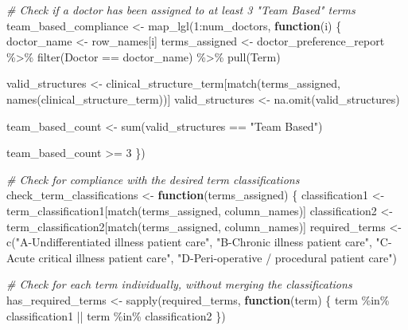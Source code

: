 \documentclass[
]{article}
\newenvironment{Shaded}{\begin{snugshade}}{\end{snugshade}}
\newcommand{\CommentTok}[1]{\textcolor[rgb]{0.56,0.35,0.01}{\textit{#1}}}
\newcommand{\ControlFlowTok}[1]{\textcolor[rgb]{0.13,0.29,0.53}{\textbf{#1}}}
\newcommand{\DecValTok}[1]{\textcolor[rgb]{0.00,0.00,0.81}{#1}}
\newcommand{\FunctionTok}[1]{\textcolor[rgb]{0.00,0.00,0.00}{#1}}
\newcommand{\NormalTok}[1]{#1}
\newcommand{\OtherTok}[1]{\textcolor[rgb]{0.56,0.35,0.01}{#1}}
\newcommand{\SpecialCharTok}[1]{\textcolor[rgb]{0.00,0.00,0.00}{#1}}
\newcommand{\StringTok}[1]{\textcolor[rgb]{0.31,0.60,0.02}{#1}}
\begin{document}
\begin{Shaded}
\begin{Highlighting}[]
\CommentTok{\# Check if a doctor has been assigned to at least 3 "Team Based" terms}
\NormalTok{team\_based\_compliance }\OtherTok{\textless{}{-}} \FunctionTok{map\_lgl}\NormalTok{(}\DecValTok{1}\SpecialCharTok{:}\NormalTok{num\_doctors, }\ControlFlowTok{function}\NormalTok{(i) \{}
\NormalTok{  doctor\_name }\OtherTok{\textless{}{-}}\NormalTok{ row\_names[i]}
\NormalTok{  terms\_assigned }\OtherTok{\textless{}{-}}\NormalTok{ doctor\_preference\_report }\SpecialCharTok{\%\textgreater{}\%}
    \FunctionTok{filter}\NormalTok{(Doctor }\SpecialCharTok{==}\NormalTok{ doctor\_name) }\SpecialCharTok{\%\textgreater{}\%}
    \FunctionTok{pull}\NormalTok{(Term)}
  
\NormalTok{  valid\_structures }\OtherTok{\textless{}{-}}\NormalTok{ clinical\_structure\_term[}\FunctionTok{match}\NormalTok{(terms\_assigned, }\FunctionTok{names}\NormalTok{(clinical\_structure\_term))]}
\NormalTok{  valid\_structures }\OtherTok{\textless{}{-}} \FunctionTok{na.omit}\NormalTok{(valid\_structures)}

\NormalTok{  team\_based\_count }\OtherTok{\textless{}{-}} \FunctionTok{sum}\NormalTok{(valid\_structures }\SpecialCharTok{==} \StringTok{"Team Based"}\NormalTok{)}
  
\NormalTok{  team\_based\_count }\SpecialCharTok{\textgreater{}=} \DecValTok{3}
\NormalTok{\})}

\CommentTok{\# Check for compliance with the desired term classifications}
\NormalTok{check\_term\_classifications }\OtherTok{\textless{}{-}} \ControlFlowTok{function}\NormalTok{(terms\_assigned) \{}
\NormalTok{  classification1 }\OtherTok{\textless{}{-}}\NormalTok{ term\_classification1[}\FunctionTok{match}\NormalTok{(terms\_assigned, column\_names)]}
\NormalTok{  classification2 }\OtherTok{\textless{}{-}}\NormalTok{ term\_classification2[}\FunctionTok{match}\NormalTok{(terms\_assigned, column\_names)]}
\NormalTok{  required\_terms }\OtherTok{\textless{}{-}} \FunctionTok{c}\NormalTok{(}\StringTok{"A{-}Undifferentiated illness patient care"}\NormalTok{, }
                      \StringTok{"B{-}Chronic illness patient care"}\NormalTok{, }
                      \StringTok{"C{-}Acute critical illness patient care"}\NormalTok{,}
                      \StringTok{"D{-}Peri{-}operative / procedural patient care"}\NormalTok{)}
  
  \CommentTok{\# Check for each term individually, without merging the classifications}
\NormalTok{  has\_required\_terms }\OtherTok{\textless{}{-}} \FunctionTok{sapply}\NormalTok{(required\_terms, }\ControlFlowTok{function}\NormalTok{(term) \{}
\NormalTok{    term }\SpecialCharTok{\%in\%}\NormalTok{ classification1 }\SpecialCharTok{||}\NormalTok{ term }\SpecialCharTok{\%in\%}\NormalTok{ classification2}
\NormalTok{  \})}
  

\end{Highlighting}
\end{Shaded}
\end{document}
